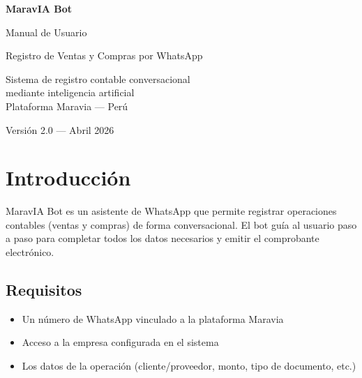 \documentclass[12pt,a4paper]{article}
\begin{document}
\begin{titlepage}
\centering
\vspace*{3cm}
{\Huge\bfseries\color{maravia} MaravIA Bot \par}
\vspace{0.5cm}
{\Large Manual de Usuario \par}
\vspace{1cm}
{\large Registro de Ventas y Compras por WhatsApp \par}
\vspace{2cm}
{\normalsize
Sistema de registro contable conversacional \\
mediante inteligencia artificial \\[1cm]
Plataforma Maravia --- Per\'u
\par}
\vfill
{\small Versi\'on 2.0 --- Abril 2026 \par}
\end{titlepage}

\tableofcontents
\newpage

\section{Introducci\'on}

MaravIA Bot es un asistente de WhatsApp que permite registrar operaciones contables (ventas y compras) de forma conversacional. El bot gu\'ia al usuario paso a paso para completar todos los datos necesarios y emitir el comprobante electr\'onico.

\subsection{Requisitos}

\begin{itemize}
    \item Un n\'umero de WhatsApp vinculado a la plataforma Maravia
    \item Acceso a la empresa configurada en el sistema
    \item Los datos de la operaci\'on (cliente/proveedor, monto, tipo de documento, etc.)
\end{itemize}

\end{document}
